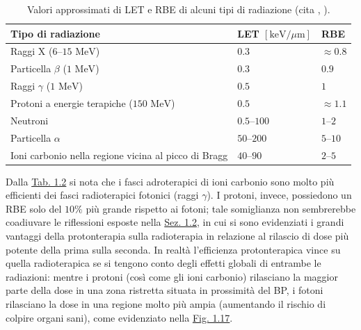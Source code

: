 \documentclass[12pt,a4paper,twoside]{report}
\begin{document}
	\begin{table}[H]
		\centering
		\begin{tabular}{ |m{10cm}||M{3cm}|M{1cm}| }
			\hline
			Tipo di radiazione & LET $\left[\mbox{keV/}\mu\mbox{m}\right]$ & RBE\\
			\hline\hline
			Raggi X ($6$--$15 \mbox{ MeV}$) & $0.3$ &	$\approx 0.8$\\
			\hline
			Particella $\beta$ ($1 \mbox{ MeV}$) & $0.3$ & $0.9$\\
			\hline
			Raggi $\gamma$ ($1 \mbox{ MeV}$) & $0.5$ & $1$\\
			\hline
			Protoni a energie terapiche ($150 \mbox{ MeV}$) & $0.5$ & $\approx1.1$\\
			\hline
			Neutroni & $0.5$--$100$ & $1$--$2$\\
			\hline
			Particella $\alpha$ & $50$--$200$ & $5$--$10$\\
			\hline
			Ioni carbonio nella regione vicina al picco di Bragg & $40$--$90$ & $2$--$5$\\
			\hline
		\end{tabular}
		\caption{Valori approssimati di LET e RBE di alcuni tipi di radiazione (cita
			,
			).}
		\label{tab:let_rbe}
	\end{table}
	Dalla \hyperref[tab:let_rbe]{Tab. 1.2} si nota che i fasci adroterapici di ioni carbonio sono molto più efficienti dei fasci radioterapici fotonici (raggi $\gamma$). I protoni, invece, possiedono un RBE solo del $10\%$ più grande rispetto ai fotoni; tale somiglianza non sembrerebbe coadiuvare le riflessioni esposte nella \hyperref[sec:1.2]{Sez. 1.2}, in cui si sono evidenziati i grandi vantaggi della protonterapia sulla radioterapia in relazione al rilascio di dose più potente della prima sulla seconda. In realtà l'efficienza protonterapica vince su quella radioterapica se si tengono conto degli effetti globali di entrambe le radiazioni: mentre i protoni (così come gli ioni carbonio) rilasciano la maggior parte della dose in una zona ristretta situata in prossimità del BP, i fotoni rilasciano la dose in una regione molto più ampia (aumentando il rischio di colpire organi sani), come evidenziato nella \hyperref[fig:photon]{Fig. 1.17}.
\end{document}
